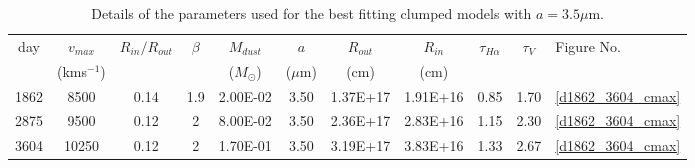 \documentclass[useAMS,usenatbib,usegraphicx]{mnras}
\begin{document}
\begin{table}
	\begin{minipage}{180mm}
	\caption{Details of the parameters used for the best fitting clumped models with $a=3.5\mu$m.}
	\label{clumped2}
	\begin{center}
  	\begin{tabular}{@{} ccccccccccl @{}}
    	\hline
  day & $v_{max}$ & $R_{in}/R_{out}$ & $\beta$ & $M_{dust}$ & $a$ & $R_{out}$ & $R_{in}$ & $\tau_{H\alpha}$ & $\tau_V$ & Figure No. \\
	& (kms$^{-1} $) & & & ($M_{\odot}$) & ($\mu$m) & (cm) & (cm)  \\
	\hline
1862 & 8500 & 0.14 & 1.9 & 2.00E-02 & 3.50 & 1.37E+17 & 1.91E+16 & 0.85 & 1.70 & \ref{d1862_3604_cmax} \\
2875 & 9500 & 0.12 & 2 & 8.00E-02 & 3.50 & 2.36E+17 & 2.83E+16 & 1.15 & 2.30 & \ref{d1862_3604_cmax} \\
3604 & 10250 & 0.12 & 2 & 1.70E-01 & 3.50 & 3.19E+17 & 3.83E+16 & 1.33 & 2.67 & \ref{d1862_3604_cmax} \\
    \hline
  \end{tabular}
  \end{center}
\end{minipage}
\end{table}
\end{document}

